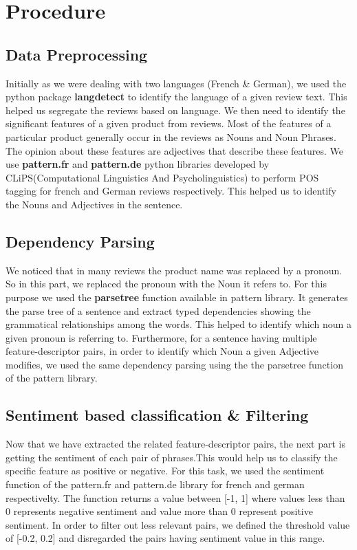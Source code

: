\documentclass[conference]{IEEEtran}
\begin{document}
\section{\textbf{Procedure}}
\subsection{\textbf{Data Preprocessing}}
\indent Initially as we were dealing with two languages (French \& German), we used the python package \textbf{langdetect} to identify the language of a given review text. This helped us segregate the reviews based on language. We then need to identify the significant features of a given product from reviews. Most of the features of a particular product generally occur in the reviews as Nouns and Noun Phrases. The opinion about these features are adjectives that describe these features. We use \textbf{pattern.fr} and \textbf{pattern.de} python libraries developed by CLiPS(Computational Linguistics And Psycholinguistics) to perform POS tagging for french and German reviews respectively. This helped us to identify the Nouns and Adjectives in the sentence. 
\subsection{\textbf{Dependency Parsing}}
\indent We noticed that in many reviews the product name was replaced by a pronoun. So in this part, we replaced the pronoun with the Noun it refers to. For this purpose we used the \textbf{parsetree} function available in pattern library. It generates the parse tree of a sentence and extract typed dependencies showing the grammatical relationships among the words. This helped to identify which noun a given pronoun is referring to. Furthermore, for a sentence having multiple feature-descriptor pairs, in order to identify which Noun a given Adjective modifies, we used the same dependency parsing using the the parsetree function of the pattern library.
\subsection{\textbf{Sentiment based classification \& Filtering}}
\indent Now that we have extracted the related feature-descriptor pairs, the next part is getting the sentiment of each pair of phrases.This would help us to classify the specific feature as positive or negative. For this task, we used the sentiment function of the pattern.fr and pattern.de library for french and german respectivelty. The function returns a value between [-1, 1] where values less than 0 represents negative sentiment and value more than 0 represent positive sentiment. In order to filter out less relevant pairs, we defined the threshold value of [-0.2, 0.2] and disregarded the pairs having sentiment value in this range. 
\end{document}
